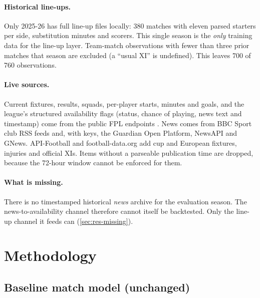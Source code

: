 \documentclass[11pt,a4paper]{article}
\begin{document}
\paragraph{Historical line-ups.}
Only 2025-26 has full line-up files locally: 380 matches with eleven parsed
starters per side, substitution minutes and scorers. This single season is the
\emph{only} training data for the line-up layer. Team-match observations with
fewer than three prior matches that season are excluded (a ``usual XI'' is
undefined). This leaves 700 of 760 observations.

\paragraph{Live sources.}
Current fixtures, results, squads, per-player starts, minutes and goals, and
the league's structured availability flags (status, chance of playing, news
text and timestamp) come from the public FPL endpoints \citep{fpl}. News comes
from BBC Sport club RSS feeds and, with keys, the Guardian Open Platform,
NewsAPI and GNews. API-Football and football-data.org add cup and European
fixtures, injuries and official XIs. Items without a parseable publication time
are dropped, because the 72-hour window cannot be enforced for them.

\paragraph{What is missing.}
There is no timestamped historical \emph{news} archive for the evaluation
season. The news-to-availability channel therefore cannot itself be
backtested. Only the line-up channel it feeds can (\cref{sec:res-missing}).

\section{Methodology}\label{sec:method}

\subsection{Baseline match model (unchanged)}\label{sec:baseline}
\end{document}
